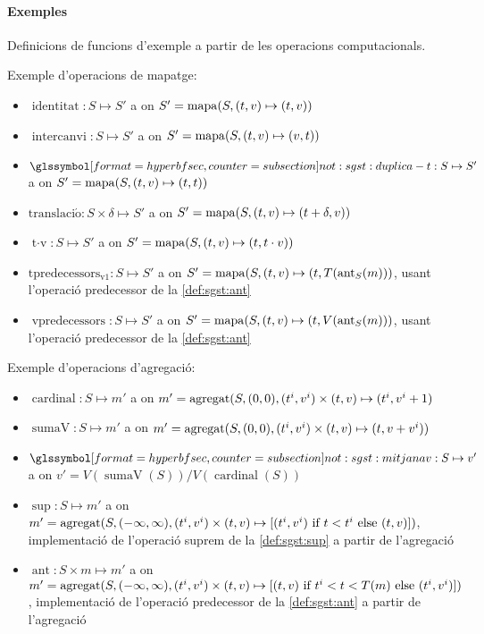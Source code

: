\paragraph{Exemples} Definicions de funcions d'exemple a partir de les
operacions computacionals.

Exemple d'operacions de mapatge:
\begin{itemize}
\item $\operatorname{identitat}: S \mapsto S'$ a on $S'=
  \operatorname*{mapa}(S,(t,v)\mapsto(t,v))$
\item $\operatorname{intercanvi}: S \mapsto S'$ a on $S'=
  \operatorname*{mapa}(S,(t,v)\mapsto(v,t))$
\item $\glssymbolsec{not:sgst:duplica-t}: S \mapsto S'$ a on $S'=
  \operatorname*{mapa}(S,(t,v)\mapsto(t,t))$
\item $\operatorname{translaci\acute{o}}: S \times \delta \mapsto S'$ a on $S'=
  \operatorname*{mapa}(S,(t,v)\mapsto(t+\delta,v))$
\item $\operatorname{t\cdot v}: S \mapsto S'$ a on $S'=
  \operatorname*{mapa}(S,(t,v)\mapsto(t,t\cdot v))$
\item $\operatorname{tpredecessors_{v1}}: S \mapsto S'$ a on $S'= \operatorname*{mapa}(S,(t,v)
  \mapsto (t,T(\operatorname*{ant}_S(m)))$, usant l'operació predecessor de la
  \autoref{def:sgst:ant}
\item $\operatorname{vpredecessors}: S \mapsto S'$ a on $S'= \operatorname*{mapa}(S,(t,v)
  \mapsto (t,V(\operatorname*{ant}_S(m)))$, usant l'operació predecessor de la
  \autoref{def:sgst:ant}
\end{itemize}

Exemple d'operacions d'agregació:
\begin{itemize}
\item $\operatorname{cardinal}: S \mapsto m'$ a on $m'=
  \operatorname*{agregat}(S,(0,0),(t^i,v^i)\times(t,v)\mapsto(t^i,v^i+1)$

\item $\operatorname{sumaV}: S \mapsto m'$ a on $m'=
  \operatorname*{agregat}(S,(0,0),(t^i,v^i)\times(t,v)\mapsto(t,v+v^i))$

\item $\glssymbolsec{not:sgst:mitjanav}: S \mapsto v'$ a on $v'=
  V(\operatorname{sumaV}(S)) / V(\operatorname{cardinal}(S))$ 

\item $\operatorname{sup}: S \mapsto m'$ a on $m'=
  \operatorname*{agregat}(S,(-\infty,\infty),(t^i,v^i)\times(t,v)\mapsto [(t^i,v^i)
  \text{ if } t < t^i \text{ else } (t,v) ])$, implementació de
  l'operació suprem de la \autoref{def:sgst:sup} a partir de
  l'agregació

\item $\operatorname{ant}: S \times m \mapsto m'$ a on $m'=
  \operatorname*{agregat}(S,(-\infty,\infty),(t^i,v^i)\times(t,v)\mapsto [(t,v)
  \text{ if } t^i < t < T(m) \text{ else } (t^i,v^i) ])$,
  implementació de l'operació predecessor de la \autoref{def:sgst:ant} a
  partir de l'agregació 
\end{itemize}


